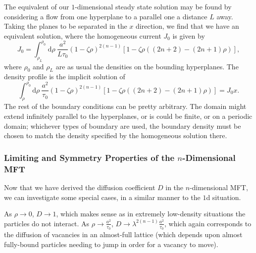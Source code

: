 The equivalent of our $1$-dimensional steady state solution may be found by considering a flow from one hyperplane to
a parallel one a distance $L$ away. Taking the planes to be separated in the $x$ direction, we find that
we have an equivalent solution, where the homogeneous current $J_0$ is given by
\begin{equation}
 J_0 = \int_{\rho_L}^{\rho_0} \! \! \mathrm{d}\rho \  \frac{a^2}{L \tau_0}\left( 1 - \zeta \rho \right)^{2(n-1)} \left[ 1 - \zeta \rho\left( (2n+2) - (2n+1)\rho \right) \right],
\end{equation}
where $\rho_0$ and $\rho_L$ are as usual the densities on the bounding hyperplanes.
The density profile is the implicit solution of
\begin{equation}
 \int_{\rho}^{\rho_0} \! \! \mathrm{d}\rho \  \frac{a^2}{\tau_0}\left( 1 - \zeta \rho \right)^{2(n-1)} \left[ 1 - \zeta \rho\left( (2n+2) - (2n+1)\rho \right) \right] = J_0 x .
\end{equation}
The rest of the boundary conditions can be pretty arbitrary. The domain might extend infinitely parallel to the hyperplanes, or is could be finite, or on a periodic domain; whichever types of boundary are used, the boundary density must be chosen to match the density specified by the
homogeneous solution there.


\subsubsection{Limiting and Symmetry Properties of the $n$-Dimensional MFT}
Now that we have derived the diffusion coefficient $D$ in the $n$-dimensional MFT, we can investigate
some special cases, in a similar manner to the $1$d situation.

As $\rho \rightarrow 0$, $D\rightarrow 1$, which makes sense as in extremely low-density situations
the particles do not interact. As $\rho \rightarrow \frac{a^2}{\tau_0}$,
$D \rightarrow \lambda^{2(n-1)}\frac{a^2}{\tau_0}$, which again corresponds to the diffusion of
vacancies in an almost-full lattice (which depends upon almost fully-bound particles needing to jump
in order for a vacancy to move).

